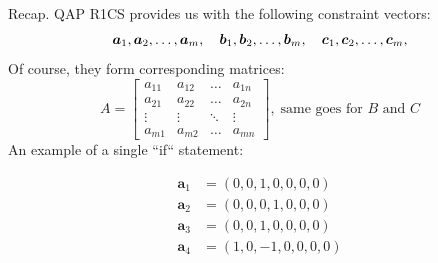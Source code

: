 \documentclass{zkdl-presentation-template}
\begin{document}
    \begin{frame}{Recap. QAP}
        R1CS provides us with the following constraint vectors:
        \vspace{-8pt}
        \begin{equation*}
            \boldsymbol{a}_1, \boldsymbol{a}_2, \dots, \boldsymbol{a}_m, \quad
            \boldsymbol{b}_1, \boldsymbol{b}_2, \dots, \boldsymbol{b}_m, \quad
            \boldsymbol{c}_1, \boldsymbol{c}_2, \dots, \boldsymbol{c}_m, 
            \vspace{-5pt}
        \end{equation*}
        Of course, they form corresponding matrices:
        \vspace{-5pt}
        \begin{equation*}
            A = \begin{bmatrix}
                a_{11} & a_{12} & \dots & a_{1n} \\
                a_{21} & a_{22} & \dots & a_{2n} \\
                \vdots & \vdots & \ddots & \vdots \\
                a_{m1} & a_{m2} & \dots & a_{mn}
            \end{bmatrix}, \;
            \text{same goes for $B$ and $C$}
        \end{equation*}
        An example of a single ``if`` statement:
        \begin{center}
            \begin{minipage}{0.4\textwidth}
            \vspace{-15pt}
            {\small \begin{align*}
                \boldsymbol{a}_1 &= (0, 0, 1, 0, 0, 0, 0) \\
                \boldsymbol{a}_2 &= (0, 0, 0, 1, 0, 0, 0) \\
                \boldsymbol{a}_3 &= (0, 0, 1, 0, 0, 0, 0) \\
                \boldsymbol{a}_4 &= (1, 0, -1, 0, 0, 0, 0)
            \end{align*}}
            \end{minipage}
            \begin{minipage}{0.5\textwidth}
                \vspace{-10pt}
\end{minipage}
\end{center}
\end{frame}
\end{document}
